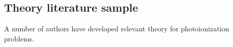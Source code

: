 \subsection{Theory literature sample\label{sec:theory-lit}}

A number of authors have developed relevant theory for photoionization problems. 